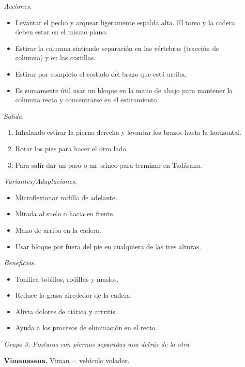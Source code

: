 \emph{Acciones.}
\begin{itemize}
\item Levantar el pecho y arquear ligeramente
espalda alta. El torso y la cadera deben
estar en el mismo plano.
\item Estirar la columna sintiendo separación
en las vértebras (tracción de columna) y en
las costillas.
\item Estirar por completo el costado del
brazo que está arriba.
\item Es sumamente útil usar un bloque en la
mano de abajo para mantener la columna recta
y concentrarse en el estiramiento.
\end{itemize}

\emph{Salida.}
\begin{enumerate}
\item Inhalando estirar la pierna derecha y
levantar los brazos hasta la horizontal.
\item Rotar los pies para hacer el otro lado.
\item Para salir dar un paso o un brinco para
terminar en Tadāsana.
\end{enumerate}

\emph{Variantes/Adaptaciones.}
\begin{itemize}
\item Microflexionar rodilla de adelante.
\item Mirada al suelo o hacia en frente.
\item Mano de arriba en la cadera.
\item Usar bloque por fuera del pie en
cualquiera de las tres alturas.
\end{itemize}

\emph{Beneficios.}
\begin{itemize}
\item Tonifica tobillos, rodillas y muslos.
\item Reduce la grasa alrededor de la cadera.
\item Alivia dolores de ciática y artritis.
\item Ayuda a los procesos de eliminación en
el recto.
\end{itemize}

\medskip\noindent\emph{Grupo 3. Posturas con
piernas separadas una detrás de la otra}

\medskip\noindent\textbf{Vimanasana.}
Viman = vehículo volador.

